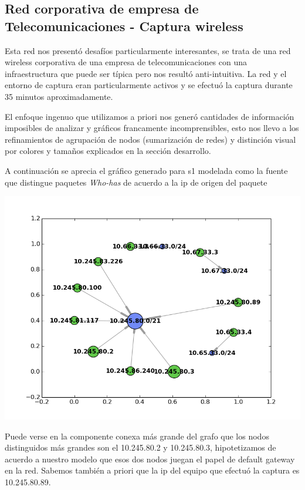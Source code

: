 \subsection{Red corporativa de empresa de Telecomunicaciones - Captura wireless}

Esta red nos presentó desafíos particularmente interesantes, se trata de una red wireless corporativa de una empresa de telecomunicaciones con una infraestructura que puede ser típica pero nos resultó anti-intuitiva. La red y el entorno de captura eran particularmente activos y se efectuó la captura durante 35 minutos aproximadamente.

El enfoque ingenuo que utilizamos a priori nos generó cantidades de información imposibles de analizar y gráficos francamente incomprensibles, esto nos llevo a los refinamientos de agrupación de nodos (sumarización de redes) y distinción visual por colores y tamaños explicados en la sección desarrollo.

A continuación se aprecia el gráfico generado para s1 modelada como la fuente que distingue paquetes \textit{Who-has} de acuerdo a la ip de origen del paquete

\includegraphics[scale=0.80]{imagenes/TCORP-wireless.png}

Puede verse en la componente conexa más grande del grafo que los nodos distinguidos más grandes son el 10.245.80.2 y 10.245.80.3, hipotetizamos de acuerdo a nuestro modelo que esos dos nodos juegan el papel de default gateway en la red. Sabemos también a priori que la ip del equipo que efectuó la captura es 10.245.80.89.

